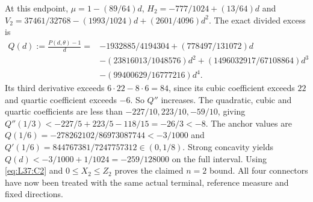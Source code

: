 At this endpoint, $\mu=1-(89/64)d$,
$H_2=-777/1024+(13/64)d$ and
$V_2=37461/32768-(1993/1024)d+(2601/4096)d^2$.
The exact divided excess is
\[
\begin{aligned}
Q(d):=\frac{P(d,\theta)-1}{d}={}&-1932885/4194304
+(778497/131072)d\\
&-(23816013/1048576)d^2+(1496032917/67108864)d^3
\\&-(99400629/16777216)d^4.
\end{aligned}
\]
Its third derivative exceeds $6\cdot22-8\cdot6=84$, since its cubic
coefficient exceeds $22$ and quartic coefficient exceeds $-6$.
So $Q''$ increases. The quadratic, cubic and quartic coefficients are
less than $-227/10,223/10,-59/10$, giving
$Q''(1/3)<-227/5+223/5-118/15=-26/3<-8$.
The anchor values are
$Q(1/6)=-278262102/86973087744<-3/1000$ and
$Q'(1/6)=844767381/7247757312\in(0,1/8)$.
Strong concavity yields
$Q(d)<-3/1000+1/1024=-259/128000$ on the full interval.
Using \eqref{eq:L37:C2} and $0\le X_2\le Z_2$ proves the claimed
$n=2$ bound. All four connectors have now been treated with the same
actual terminal, reference measure and fixed directions.
